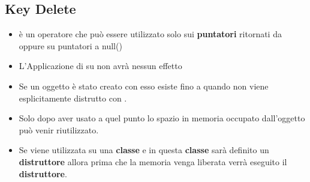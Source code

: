 \subsection{Key Delete}
\begin{itemize}
    \item \textcolor{blue}{} è un operatore che può essere utilizzato solo sui \textbf{puntatori} ritornati da  oppure su puntatori a null()
    \item L'Applicazione di  su  non avrà nessun effetto
    \item Se un oggetto è stato creato con  esso esiste fino a
    quando non viene esplicitamente distrutto con .
    \item Solo dopo aver usato  a quel punto lo spazio in memoria occupato dall’oggetto può venir riutilizzato.
    \item Se  viene utilizzata su una \textbf{classe} e in questa \textbf{classe} sarà definito un \textbf{distruttore} allora prima che la memoria venga liberata verrà eseguito il \textbf{distruttore}.
\end{itemize}
\newpage
